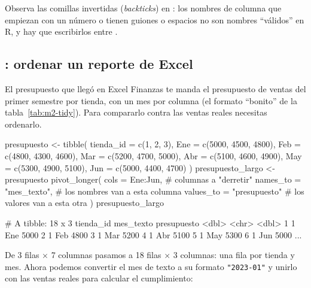 Observa las comillas invertidas (\emph{backticks}) en
: los nombres de columna que empiezan con un número o
tienen guiones o espacios no son nombres ``válidos'' en R, y hay que
escribirlos entre  .

\subsection{\texorpdfstring{}{pivot\_longer()}: ordenar un reporte de Excel}

\begin{ejemplo}{El presupuesto que llegó en Excel}
Finanzas te manda el presupuesto de ventas del primer semestre por tienda,
con un mes por columna (el formato ``bonito'' de la tabla~\ref{tab:m2-tidy}).
Para compararlo contra las ventas reales necesitas ordenarlo.
\end{ejemplo}

\begin{rcode}
presupuesto <- tibble(
  tienda_id = c(1, 2, 3),
  Ene = c(5000, 4500, 4800), Feb = c(4800, 4300, 4600),
  Mar = c(5200, 4700, 5000), Abr = c(5100, 4600, 4900),
  May = c(5300, 4900, 5100), Jun = c(5000, 4400, 4700)
)
presupuesto_largo <- presupuesto %
  pivot_longer(
    cols      = Ene:Jun,          # columnas a "derretir"
    names_to  = "mes_texto",      # los nombres van a esta columna
    values_to = "presupuesto"     # los valores van a esta otra
  )
presupuesto_largo
\end{rcode}
\begin{rsalida}
# A tibble: 18 x 3
   tienda_id mes_texto presupuesto
       <dbl> <chr>           <dbl>
 1         1 Ene              5000
 2         1 Feb              4800
 3         1 Mar              5200
 4         1 Abr              5100
 5         1 May              5300
 6         1 Jun              5000
...
\end{rsalida}

De 3 filas $\times$ 7 columnas pasamos a 18 filas $\times$ 3 columnas: una
fila por tienda y mes. Ahora podemos convertir el mes de texto a su formato
\texttt{"2023-01"} y unirlo con las ventas reales para calcular el
cumplimiento:

